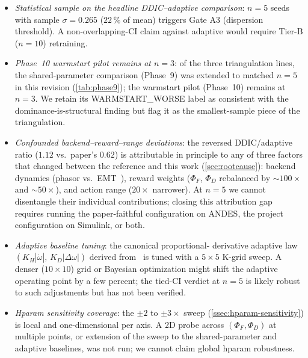 \documentclass[journal,onecolumn,11pt]{IEEEtran}
\begin{document}
\begin{itemize}
  \item \emph{Statistical sample on the headline DDIC--adaptive
        comparison}: $n = 5$ seeds with sample $\sigma = 0.265$
        ($22\,\%$ of mean) triggers Gate A3 (dispersion threshold).
        A non-overlapping-CI claim against adaptive would require
        Tier-B ($n = 10$) retraining.
  \item \emph{Phase~10 warmstart pilot remains at $n = 3$}: of the
        three triangulation lines, the shared-parameter comparison
        (Phase~9) was extended to matched $n = 5$ in this revision
        (\cref{tab:phase9}); the warmstart pilot (Phase~10) remains
        at $n = 3$. We retain its WARMSTART\_WORSE label as
        consistent with the dominance-is-structural finding but
        flag it as the smallest-sample piece of the triangulation.
  \item \emph{Confounded backend--reward--range deviations}: the
        reversed DDIC/adaptive ratio ($1.12$ vs.\ paper's $0.62$) is
        attributable in principle to any of three factors that
        changed between the reference and this work
        (\cref{sec:rootcause}): backend dynamics
        (phasor vs.\ EMT~\cite{stiasny2023phasor}), reward weights
        ($\Phi_F$, $\Phi_D$ rebalanced by $\sim 100\times$ and $\sim 50\times$),
        and action range ($20\times$ narrower). At $n = 5$ we
        cannot disentangle their individual contributions; closing
        this attribution gap requires running the paper-faithful
        configuration on ANDES, the project configuration on
        Simulink, or both.
  \item \emph{Adaptive baseline tuning}: the canonical proportional-
        derivative adaptive law $(K_H |\dot\omega|,\,K_D|\Delta\omega|)$
        derived from~\cite{bevrani2014vsg,darco2015vsm} is tuned with
        a $5{\times}5$ K-grid sweep. A denser ($10{\times}10$) grid or
        Bayesian optimization might shift the adaptive operating
        point by a few percent; the tied-CI verdict at $n = 5$ is
        likely robust to such adjustments but has not been verified.
  \item \emph{Hparam sensitivity coverage}: the $\pm 2$ to
        $\pm 3\times$ sweep (\cref{ssec:hparam-sensitivity}) is local
        and one-dimensional per axis. A 2D probe across
        $(\Phi_F, \Phi_D)$ at multiple points, or extension of the
        sweep to the shared-parameter and adaptive baselines, was
        not run; we cannot claim global hparam robustness.

\end{itemize}
\end{document}
